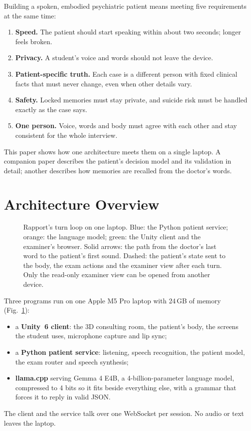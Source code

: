 \documentclass{article}
\begin{document}
Building a spoken, embodied psychiatric patient means meeting five requirements at the same time:
\begin{enumerate}
\item \textbf{Speed.} The patient should start speaking within about two seconds; longer feels broken.
\item \textbf{Privacy.} A student's voice and words should not leave the device.
\item \textbf{Patient-specific truth.} Each case is a different person with fixed clinical facts that must never change, even when other
details vary.
\item \textbf{Safety.} Locked memories must stay private, and suicide risk must be handled exactly as the case says.
\item \textbf{One person.} Voice, words and body must agree with each other and stay consistent for the whole interview.
\end{enumerate}
This paper shows how one architecture meets them on a single laptop. A companion paper describes the patient's decision model and its
validation in detail; another describes how memories are recalled from the doctor's words.

\section{Architecture Overview}

\begin{figure}[t]
\caption{Rapport's turn loop on one laptop. Blue: the Python patient service; orange: the language model; green: the Unity client and the
examiner's browser. Solid arrows: the path from the doctor's last word to the patient's first sound. Dashed: the patient's state sent to the
body, the exam actions and the examiner view after each turn. Only the read-only examiner view can be opened from another device.}
\label{fig:arch}
\end{figure}

Three programs run on one Apple M5 Pro laptop with 24\,GB of memory (Fig.~\ref{fig:arch}):
\begin{itemize}
\item a \textbf{Unity~6 client}: the 3D consulting room, the patient's body, the screens the student uses, microphone capture and lip sync;
\item a \textbf{Python patient service}: listening, speech recognition, the patient model, the exam router and speech synthesis;
\item \textbf{llama.cpp} \cite{llamacpp} serving Gemma 4 E4B, a 4-billion-parameter language model, compressed to 4 bits so it fits beside
everything else, with a grammar that forces it to reply in valid JSON.
\end{itemize}
The client and the service talk over one WebSocket per session. No audio or text leaves the laptop.
\end{document}
